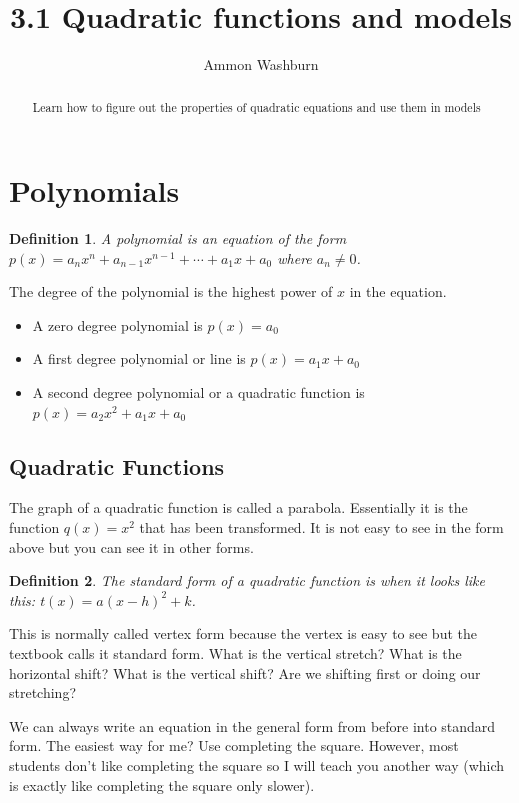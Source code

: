 \documentclass{tufte-handout}
\title{3.1 Quadratic functions and models}
\author[AW]{Ammon Washburn}
\newtheorem{mydef}{Definition}
\begin{document}
\maketitle

\begin{abstract}
Learn how to figure out the properties of quadratic equations and use them in models
\end{abstract}

\section{Polynomials}

\begin{mydef}
A polynomial is an equation of the form $p(x) = a_n x^n + a_{n-1} x^{n-1} + \cdots + a_1 x + a_0$ where $a_n \neq 0$.
\end{mydef}

The degree of the polynomial is the highest power of $x$ in the equation.

\begin{itemize}
\item A zero degree polynomial is $p(x) = a_0$
\item A first degree polynomial or line is $p(x) = a_1 x + a_0$
\item A second degree polynomial or a quadratic function is $p(x) = a_2 x^2 + a_1 x + a_0$
\end{itemize}

\subsection{Quadratic Functions}
The graph of a quadratic function is called a parabola.  Essentially it is the function $q(x) = x^2$ that has been transformed.  It is not easy to see in the form above but you can see it in other forms.

\begin{mydef}
The standard form of a quadratic function is when it looks like this: $t(x) = a(x-h)^2 + k$.
\end{mydef}

This is normally called vertex form because the vertex is easy to see but the textbook calls it standard form.  What is the vertical stretch? What is the horizontal shift? What is the vertical shift? Are we shifting first or doing our stretching?

We can always write an equation in the general form from before into standard form.  The easiest way for me? Use completing the square.  However, most students don't like completing the square so I will teach you another way (which is exactly like completing the square only slower).
\end{document}
